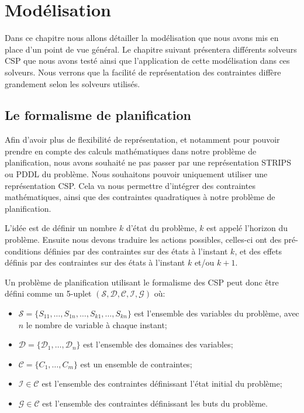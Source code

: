 \chapter{Modélisation}
\label{chapter:model}
Dans ce chapitre nous allons détailler la modélisation que nous avons mis en place d'un point de vue général. Le chapitre suivant présentera différents solveurs CSP que nous avons testé ainsi que l'application de cette modélisation dans ces solveurs. Nous verrons que la facilité de représentation des contraintes diffère grandement selon les solveurs utilisés.
\section{Le formalisme de planification}
Afin d'avoir plus de flexibilité de représentation, et notamment pour pouvoir prendre en compte des calculs mathématiques dans notre problème de planification, nous avons souhaité ne pas passer par une représentation STRIPS ou PDDL du problème. Nous souhaitons pouvoir uniquement utiliser une représentation CSP. Cela va nous permettre d'intégrer des contraintes mathématiques, ainsi que des contraintes quadratiques à notre problème de planification.

L'idée est de définir un nombre $k$ d'état du problème, $k$ est appelé l'horizon du problème. Ensuite nous devons traduire les actions possibles, celles-ci ont des pré-conditions définies par des contraintes sur des états à l'instant $k$, et des effets définis par des contraintes sur des états à l'instant $k$ et/ou $k+1$.

\begin{definition} Un problème de planification utilisant le formalisme des CSP peut donc être défini comme un 5-uplet $(\mathcal{S},\mathcal{D},\mathcal{C},\mathcal{I},\mathcal{G})$ où:
	\label{def:CSP-planif}
	\begin{itemize}
		\item $\mathcal{S} = \{S_{11}, \dots, S_{1n}, \dots, S_{k1}, \dots, S_{kn}\}$ est l'ensemble des variables du problème, avec $n$ le nombre de variable à chaque instant;
		\item $\mathcal{D} = \{\mathcal{D}_1, \dots, \mathcal{D}_n \}$ est l'ensemble des domaines des variables;
		\item $\mathcal{C} = \{C_1, \dots, C_m \}$ est un ensemble de contraintes;
		\item $\mathcal{I} \in \mathcal{C}$ est l'ensemble des contraintes définissant l'état initial du problème;
		\item $\mathcal{G} \in \mathcal{C}$ est l'ensemble des contraintes définissant les buts du problème. 
	\end{itemize}
\end{definition}


